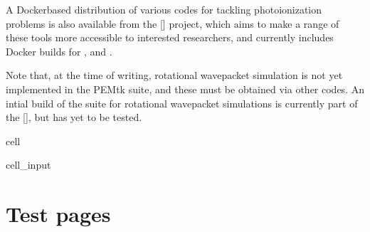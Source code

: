 \documentclass[letterpaper,10pt,english]{jupyterBook}
\begin{document}
\sphinxAtStartPar
A Docker\sphinxhyphen{}based distribution of various codes for tackling
photoionization problems is also available from the  {[}{]}
project, which aims to make a range of these tools more accessible to
interested researchers, and currently includes Docker builds for ,  and .

\sphinxAtStartPar
Note that, at the time of writing, rotational wavepacket simulation is
not yet implemented in the PEMtk suite, and these must be obtained via
other codes. An intial build of the  suite for rotational wavepacket simulations is currently part of the  {[}{]}, but has yet to be tested.

\begin{sphinxuseclass}{cell}\begin{sphinxVerbatimInput}

\begin{sphinxuseclass}{cell_input}
\begin{sphinxVerbatim}[commandchars=\\\{\}]
          \PYG{p}{[}    \PYG{p}{]}
\end{sphinxVerbatim}

\end{sphinxuseclass}\end{sphinxVerbatimInput}

\end{sphinxuseclass}
\sphinxstepscope


\part{Test pages}

\sphinxstepscope
\end{document}
